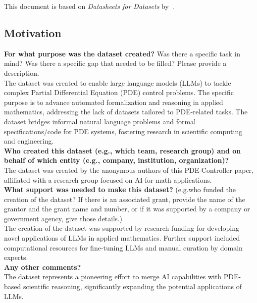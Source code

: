 
This document is based on \textit{Datasheets for Datasets} by~\cite{gebru2021datasheets}.


\subsection{Motivation}

    \textcolor{\sectioncolor}{\textbf{For what purpose was the dataset created?
    }
    Was there a specific task in mind? Was there
    a specific gap that needed to be filled? Please provide a description.
    } \\
    The dataset was created to enable large language models (LLMs) to tackle complex Partial Differential Equation (PDE) control problems. The specific purpose is to advance automated formalization and reasoning in applied mathematics, addressing the lack of datasets tailored to PDE-related tasks. The dataset bridges informal natural language problems and formal specifications/code for PDE systems, fostering research in scientific computing and engineering.
    \\
    
    \textcolor{\sectioncolor}{\textbf{Who created this dataset (e.g., which team, research group) and on behalf
    of which entity (e.g., company, institution, organization)?
    }
    } \\
    The dataset was created by the anonymous authors of this PDE-Controller paper, affiliated with a research group focused on AI-for-math applications. \\
    
    \textcolor{\sectioncolor}{\textbf{What support was needed to make this dataset?
    }
    (e.g.who funded the creation of the dataset? If there is an associated
    grant, provide the name of the grantor and the grant name and number, or if
    it was supported by a company or government agency, give those details.)
    } \\
    The creation of the dataset was supported by research funding for developing novel applications of LLMs in applied mathematics. Further support included computational resources for fine-tuning LLMs and manual curation by domain experts. \\
    
    \textcolor{\sectioncolor}{\textbf{Any other comments?
    }} \\
    The dataset represents a pioneering effort to merge AI capabilities with PDE-based scientific reasoning, significantly expanding the potential applications of LLMs. \\

